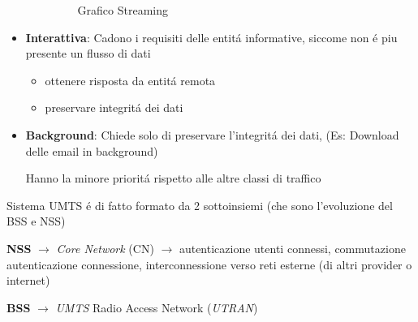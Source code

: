 \documentclass{article}
\begin{document}
\begin{itemize}
\begin{itemize}
                    \begin{figure}[h]
                        \centering
                            \caption{Grafico Streaming}
                        \end{figure}
                \end{itemize}

            \item \textbf{Interattiva}: Cadono i requisiti delle entit\'a informative, siccome non \'e piu presente un flusso di dati
                \begin{itemize}
                    \item ottenere risposta da entit\'a remota
                    \item preservare integrit\'a dei dati
                \end{itemize}

        \item \textbf{Background}: Chiede solo di preservare l'integrit\'a dei dati, (Es: Download delle email in background)

            Hanno la minore priorit\'a rispetto alle altre classi di traffico

    \end{itemize}
Sistema UMTS \'e di fatto formato da 2 sottoinsiemi (che sono l'evoluzione del BSS e NSS)

\textbf{NSS} $\rightarrow$ \textit{Core Network} (CN) $\rightarrow$ autenticazione utenti connessi, commutazione autenticazione connessione, interconnessione verso reti esterne (di altri provider o internet)

\textbf{BSS} $\rightarrow$ \textit{UMTS} Radio Access Network (\textit{UTRAN})
\end{document}
